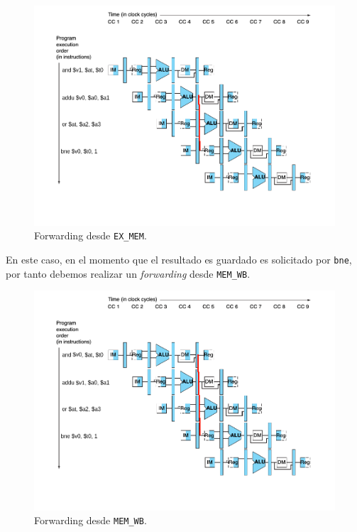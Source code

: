 \documentclass[a4paper]{article}
\begin{document}
\begin{figure}[H]
	\begin{center}				
	\includegraphics[width=1\textwidth,center]{bexmemfwd.png}
  	\caption{Forwarding desde \texttt{EX\_MEM}.}
  	\label{fig:funcionamiento.}
  	\end{center}
\end{figure}

En este caso, en el momento que el resultado es guardado es solicitado por \texttt{bne}, por tanto debemos realizar un \textit{forwarding} desde \texttt{MEM\_WB}.

\begin{figure}[H]
	\begin{center}				
	\includegraphics[width=1\textwidth,center]{bmemwbfwd.png}
  	\caption{Forwarding desde \texttt{MEM\_WB}.}
  	\label{fig:funcionamiento.}
  	\end{center}
\end{figure}
\end{document}
